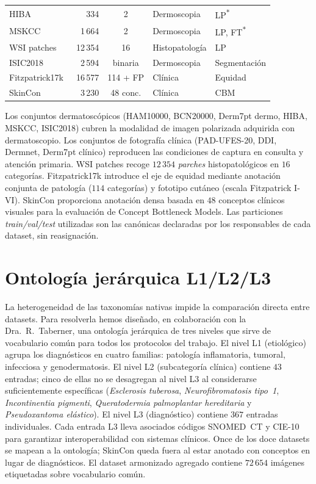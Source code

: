 \begin{table}[H]
\begin{tabular}{lrcll}
HIBA                                 & 334     & 2        & Dermoscopia      & LP\textsuperscript{$\ast$} \\
MSKCC                                & 1\,664  & 2        & Dermoscopia      & LP, FT\textsuperscript{$\ast$} \\
WSI patches                          & 12\,354 & 16       & Histopatología   & LP \\
ISIC2018~\cite{isic2018}             & 2\,594  & binaria  & Dermoscopia      & Segmentación \\
Fitzpatrick17k~\cite{fitzpatrick17k} & 16\,577 & 114 + FP & Clínica          & Equidad \\
SkinCon~\cite{skincon}               & 3\,230  & 48 conc. & Clínica          & CBM \\
\hline
\end{tabular}
\end{table}

Los conjuntos dermatoscópicos (HAM10000, BCN20000, Derm7pt dermo,
HIBA, MSKCC, ISIC2018) cubren la modalidad de imagen polarizada
adquirida con dermatoscopio. Los conjuntos de fotografía clínica
(PAD-UFES-20, DDI, Dermnet, Derm7pt clínico) reproducen las
condiciones de captura en consulta y atención primaria. WSI patches
recoge $12\,354$ \emph{parches} histopatológicos en $16$
categorías. Fitzpatrick17k introduce el eje de equidad mediante
anotación conjunta de patología ($114$ categorías) y fototipo
cutáneo (escala Fitzpatrick I-VI). SkinCon proporciona anotación
densa basada en $48$ conceptos clínicos visuales para la
evaluación de Concept Bottleneck Models. Las particiones
\emph{train/val/test} utilizadas son las canónicas declaradas por
los responsables de cada dataset, sin reasignación.

\section{Ontología jerárquica L1/L2/L3}
\label{sec:ontologia}

La heterogeneidad de las taxonomías nativas impide la comparación
directa entre datasets. Para resolverla hemos diseñado, en
colaboración con la Dra.~R.~Taberner, una ontología jerárquica de
tres niveles que sirve de vocabulario común para todos los protocolos
del trabajo. El nivel L1 (etiológico) agrupa los diagnósticos
en cuatro familias: patología inflamatoria, tumoral, infecciosa y
genodermatosis. El nivel L2 (subcategoría clínica) contiene
$43$ entradas; cinco de ellas no se desagregan al nivel L3 al
considerarse suficientemente específicas (\emph{Esclerosis
tuberosa}, \emph{Neurofibromatosis tipo~1}, \emph{Incontinentia
pigmenti}, \emph{Queratodermia palmoplantar hereditaria} y
\emph{Pseudoxantoma elástico}). El nivel L3 (diagnóstico) contiene
$367$ entradas individuales. Cada entrada L3 lleva asociados
códigos SNOMED~CT y CIE-10 para garantizar interoperabilidad con
sistemas clínicos. Once de los doce datasets se mapean a la
ontología; SkinCon queda fuera al estar anotado con conceptos en
lugar de diagnósticos. El dataset armonizado agregado contiene
$72\,654$ imágenes etiquetadas sobre vocabulario común.

